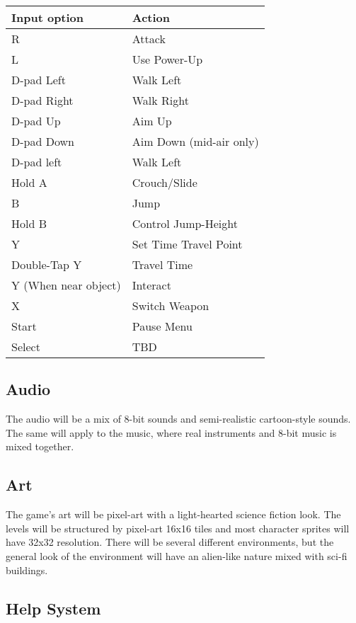 \documentclass[12pt]{article}
\begin{document}
\begin{center}
\begin{tabular}{ | l | l | }
 \hline
 \textbf{Input option} & \textbf{Action} \\
 \hline
 R & Attack \\  
 \hline 
 L & Use Power-Up \\
 \hline
 D-pad Left & Walk Left \\
 \hline
 D-pad Right & Walk Right \\
 \hline
 D-pad Up & Aim Up \\
 \hline
 D-pad Down & Aim Down (mid-air only) \\
 \hline
 D-pad left & Walk Left \\
 \hline
 Hold A & Crouch/Slide \\
 \hline
 B & Jump \\
 \hline
 Hold B & Control Jump-Height\\
 \hline
 Y & Set Time Travel Point \\
 \hline
 Double-Tap Y & Travel Time \\
 \hline
  Y (When near object) & Interact \\
 \hline
 X & Switch Weapon \\
 \hline
 Start & Pause Menu \\
 \hline
 Select & TBD \\
 \hline
\end{tabular}
\end{center}

\subsection{Audio}

The audio will be a mix of 8-bit sounds and semi-realistic cartoon-style sounds. The same will apply to the music, where real instruments and 8-bit music is mixed together. 

\subsection{Art}

The game's art will be pixel-art with a light-hearted science fiction look. The levels will be structured by pixel-art 16x16 tiles and most character sprites will have 32x32 resolution. There will be several different environments, but the general look of the environment will have an alien-like nature mixed with sci-fi buildings. 

\subsection{Help System}
\end{document}
